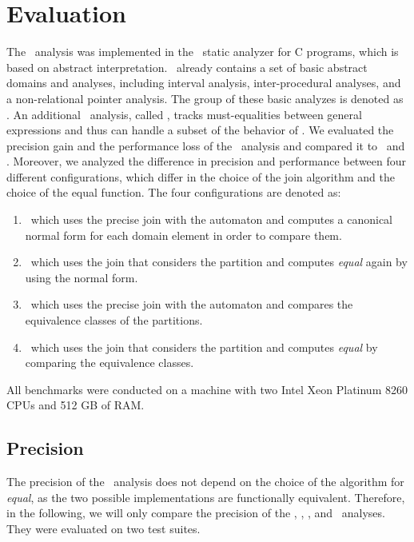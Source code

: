 \chapter{Evaluation}\label{chapter:evaluation}


The \cpo\ analysis was implemented in the \goblint\ static analyzer for C programs, which is based on abstract interpretation.
\goblint\ already contains a set of basic abstract domains and analyses,
including interval analysis, inter-procedural analyses, and a non-relational pointer analysis.
The group of these basic analyzes is denoted as \base.
An additional \goblint\ analysis, called \vareq, tracks must-equalities between general expressions
and thus can handle a subset of the behavior of \cpo.
We evaluated the precision gain and the performance loss of the \cpo\ analysis and compared it to \base\ and \vareq.
Moreover, we analyzed the difference in precision and performance between four different
configurations, which differ in the choice of the join algorithm and the choice of the equal function.
The four configurations are denoted as:
\begin{enumerate}
    \item \cpou\, which uses the precise join with the automaton and computes a canonical normal form for each domain element in order to compare them.
    \item \cpod\, which uses the join that considers the partition and computes \emph{equal} again by using the normal form.
    \item \cpot\, which uses the precise join with the automaton and compares the equivalence classes of the partitions.
    \item \cpoq\, which uses the join that considers the partition and computes \emph{equal} by comparing the equivalence classes.
\end{enumerate}
All benchmarks were conducted on a machine with two Intel Xeon Platinum 8260 CPUs and 512 GB of RAM.

\section{Precision}

The precision of the \cpo\ analysis does not depend on the choice of the algorithm for \emph{equal}, as the two possible implementations are functionally equivalent.
Therefore, in the following, we will only compare the precision of the \cpou, \cpod, \base, and \vareq\ analyses.
They were evaluated on two test suites.

